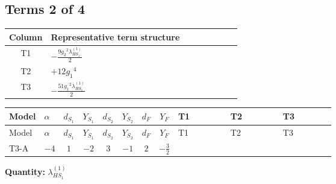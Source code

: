 \documentclass[8pt]{article}
\begin{document}
\begin{landscape}
\subsection*{Terms 2 of 4}
\begin{center}
\begin{tabular}{@{}c >{\raggedright\arraybackslash}p{0.82\linewidth}@{}}
\toprule
Column & Representative term structure \\
\midrule
T1 & \(\displaystyle -\frac{9 {g_2}^2 {\lambda_{HS_1}^{(1)}}}{2}\) \\
\midrule
T2 & \(\displaystyle +12 {g_1}^4\) \\
\midrule
T3 & \(\displaystyle -\frac{51 {g_1}^2 {\lambda_{HS_1}^{(1)}}}{2}\) \\
\midrule
\bottomrule
\end{tabular}
\end{center}
\smallskip
\tiny
\begin{longtable}{@{}llcccccc >{\raggedright\arraybackslash}p{0.21\linewidth} >{\raggedright\arraybackslash}p{0.21\linewidth} >{\raggedright\arraybackslash}p{0.21\linewidth}@{}}
\toprule
Model & $\alpha$ & $d_{S_1}$ & $Y_{S_1}$ & $d_{S_2}$ & $Y_{S_2}$ & $d_F$ & $Y_F$ & T1 & T2 & T3 \\
\midrule
\endfirsthead
\toprule
Model & $\alpha$ & $d_{S_1}$ & $Y_{S_1}$ & $d_{S_2}$ & $Y_{S_2}$ & $d_F$ & $Y_F$ & T1 & T2 & T3 \\
\midrule
\endhead
T3-A & $-4$ & $1$ & $-2$ & $3$ & $-1$ & $2$ & $-\frac{3}{2}$ & \scriptsize\adjustbox{max width=\linewidth}{$\begin{gathered} -\frac{9 {g_2}^2 {\lambda_{HS_1}^{(1)}}}{2}\end{gathered}$} & \scriptsize\adjustbox{max width=\linewidth}{$\begin{gathered} +12 {g_1}^4\end{gathered}$} & \scriptsize\adjustbox{max width=\linewidth}{$\begin{gathered} -\frac{51 {g_1}^2 {\lambda_{HS_1}^{(1)}}}{2}\end{gathered}$} \\
\midrule
\bottomrule
\end{longtable}
\clearpage
\noindent\textbf{Quantity: }$\lambda_{HS_1}^{(1)}$\par\smallskip

\end{landscape}
\end{document}
